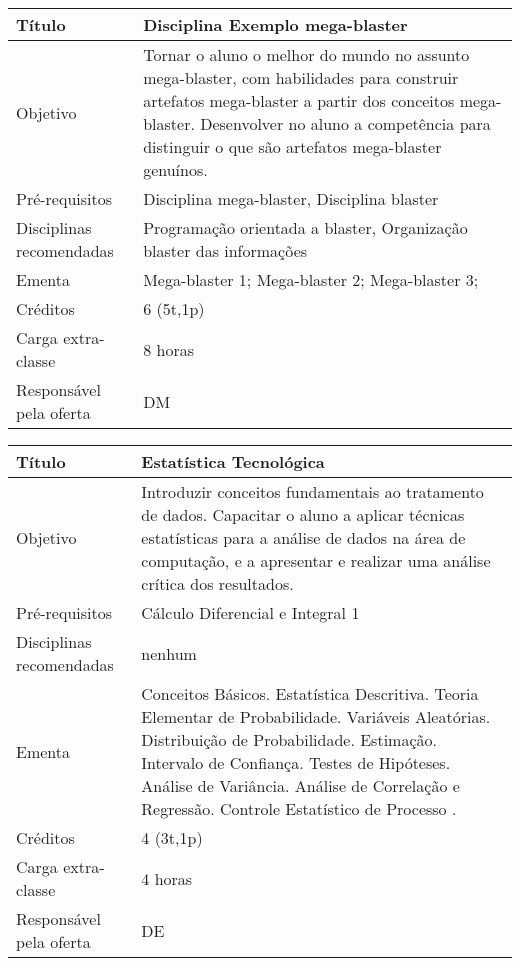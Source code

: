 \begin{tabular}{|p{4.5cm}|p{10.0cm}|} \hline

Título & Disciplina Exemplo mega-blaster \\ \hline
Objetivo & Tornar o aluno o melhor do mundo no assunto mega-blaster, com habilidades para construir
artefatos mega-blaster a partir dos conceitos mega-blaster. Desenvolver no aluno a competência para distinguir o que são artefatos mega-blaster genuínos. \\ \hline
Pré-requisitos & Disciplina mega-blaster, Disciplina blaster \\ \hline
Disciplinas recomendadas & Programação orientada a blaster, Organização blaster das informações \\ \hline
Ementa & Mega-blaster 1; Mega-blaster 2; Mega-blaster 3; \\ \hline
Créditos & 6 (5t,1p) \\ \hline
Carga extra-classe & 8 horas \\ \hline
Responsável pela oferta & DM \\ \hline
\end{tabular}








\begin{tabular}{|p{4.5cm}|p{10.0cm}|} \hline
Título & Estatística Tecnológica \\ \hline
Objetivo &  Introduzir conceitos fundamentais ao tratamento de dados. Capacitar o aluno a aplicar técnicas estatísticas para a análise de dados na área de computação, e a  apresentar e realizar uma análise crítica dos resultados.
 \\ \hline
Pré-requisitos & Cálculo Diferencial e Integral 1 \\ \hline
Disciplinas recomendadas & nenhum \\ \hline
Ementa &  Conceitos Básicos. Estatística Descritiva. Teoria Elementar de Probabilidade. Variáveis Aleatórias. Distribuição de Probabilidade. Estimação. Intervalo de Confiança. Testes de Hipóteses. Análise de Variância. Análise de Correlação e Regressão. Controle Estatístico de Processo .
 \\ \hline
Créditos & 4 (3t,1p) \\ \hline
Carga extra-classe & 4 horas \\ \hline
Responsável pela oferta & DE\\ \hline
\end{tabular}



